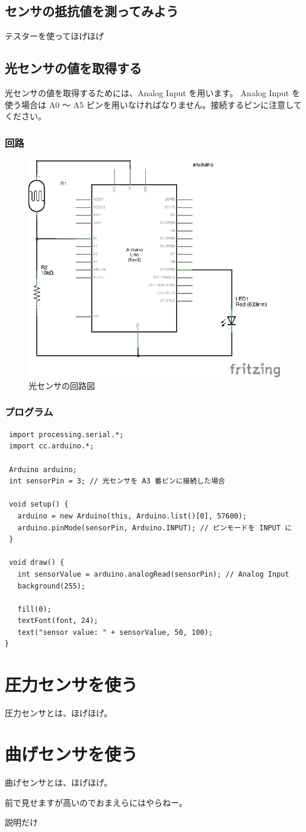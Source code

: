 \documentclass[11pt,a4paper]{jarticle}
\begin{document}

\subsection*{センサの抵抗値を測ってみよう}
テスターを使ってほげほげ

\subsection*{光センサの値を取得する}
光センサの値を取得するためには、Analog Input を用います。
Analog Input を使う場合は A0 〜 A5 ピンを用いなければなりません。接続するピンに注意してください。

\subsubsection*{回路}
\begin{figure}[h!]
 \centering
 \includegraphics[width=0.5\columnwidth]{img/light_sensor.eps}
 \caption{光センサの回路図}
\end{figure}


\subsubsection*{プログラム}
\begin{lstlisting}
 import processing.serial.*;
 import cc.arduino.*;
 
 Arduino arduino;
 int sensorPin = 3; // 光センサを A3 番ピンに接続した場合
 
 void setup() {
   arduino = new Arduino(this, Arduino.list()[0], 57600);
   arduino.pinMode(sensorPin, Arduino.INPUT); // ピンモードを INPUT に
 }

 void draw() {
   int sensorValue = arduino.analogRead(sensorPin); // Analog Input
   background(255);

   fill(0);
   textFont(font, 24);
   text("sensor value: " + sensorValue, 50, 100);
}
\end{lstlisting}


\section{圧力センサを使う}
圧力センサとは、ほげほげ。

\section{曲げセンサを使う}
曲げセンサとは、ほげほげ。

前で見せますが高いのでおまえらにはやらねー。

説明だけ
\end{document}
